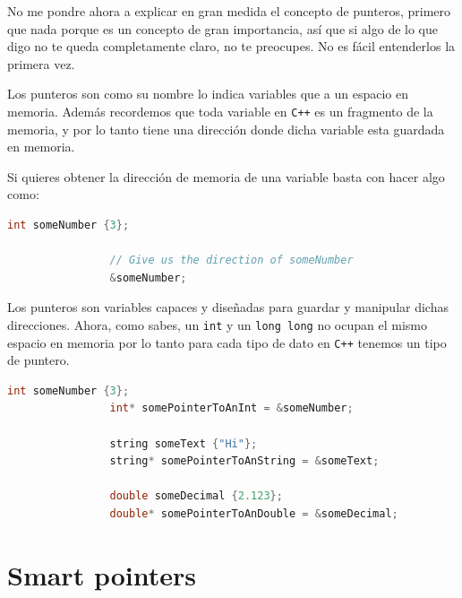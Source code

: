 \documentclass[12pt, fleqn]{report}                             %
\newcommand \Quote              {\qq}                           %
\theoremstyle{break}                                            %
\newcommand{\textCode}[1]  { \texttt{#1} }                      %
\newcommand{\Cpp}{\ignorespaces\textCode{C++}}                  %
\begin{document}
            No me pondre ahora a explicar en gran medida el concepto de punteros, 
            primero que nada porque es un concepto de gran importancia, así que si algo de lo que
            digo no te queda completamente claro, no te preocupes. No es fácil entenderlos la primera vez.

            Los punteros son como su nombre lo indica variables que \Quote{apuntan} a un espacio en memoria.
            Además recordemos que toda variable en \Cpp es un fragmento de la memoria, y por lo tanto tiene
            una dirección donde dicha variable esta guardada en memoria.

            Si quieres obtener la dirección de memoria de una variable basta con hacer algo como:
            \begin{lstlisting}[language=C++, gobble=16]
                int someNumber {3};

                // Give us the direction of someNumber
                &someNumber;
            \end{lstlisting}

            Los punteros son variables capaces y diseñadas para guardar y manipular dichas direcciones.
            Ahora, como sabes, un \textCode{int} y un \textCode{long long} no ocupan el 
            mismo espacio en memoria por lo tanto para cada tipo de dato en \Cpp tenemos un tipo de puntero.
            \begin{lstlisting}[language=C++, gobble=16]
                int someNumber {3};
                int* somePointerToAnInt = &someNumber;

                string someText {"Hi"};
                string* somePointerToAnString = &someText;

                double someDecimal {2.123};
                double* somePointerToAnDouble = &someDecimal;
            \end{lstlisting}

        \clearpage
        \section{Smart pointers}

    \clearpage
\end{document}
